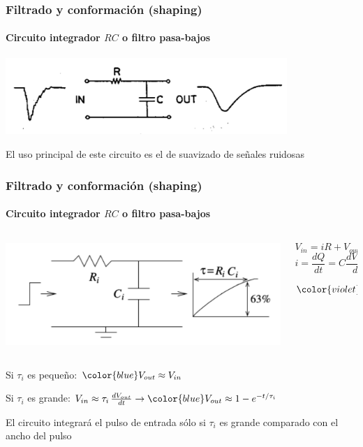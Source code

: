 \documentclass{beamer}
\begin{document}
\begin{frame}
\frametitle{Filtrado y conformación (shaping)}
\framesubtitle{{\color{blue}Circuito integrador $RC$ o filtro pasa-bajos}}
\begin{center}
\includegraphics[width=0.8\textwidth]{d2/filtrado_por_integracion}
\end{center}
El uso principal de este circuito es el de {\color{blue}suavizado de señales ruidosas} 
\end{frame}

\begin{frame}
\frametitle{Filtrado y conformación (shaping)}
\framesubtitle{{\color{blue}Circuito integrador $RC$ o filtro pasa-bajos}}
\begin{columns}
\begin{column}{0.5\textwidth}
\begin{center}
\includegraphics[width=\textwidth]{d2/rc_integrator2}
\end{center}
\end{column}
\begin{column}{0.5\textwidth}
$$V_{in} = iR + V_{out}$$
$$i = \frac{dQ}{dt} = C\frac{dV_{out}}{dt}$$
$${\color{violet}V_{in} = RC\frac{dV_{out}}{dt} + V_{out}}$$
\end{column}
\end{columns}
\begin{alertblock}{}
Si $\tau_i$ es pequeño:
${\color{blue}V_{out} \approx V_{in}}$

\vspace{2mm}
Si $\tau_i$ es grande:
$V_{in} \approx \tau_i\,\frac{dV_{out}}{dt} \rightarrow {\color{blue}V_{out}
\approx 1 - e^{-t/\tau_i}} $
\end{alertblock}
\alert{El circuito integrará el pulso de entrada sólo si $\tau_i$ es grande 
comparado con el ancho del pulso}
\end{frame}
\end{document}
